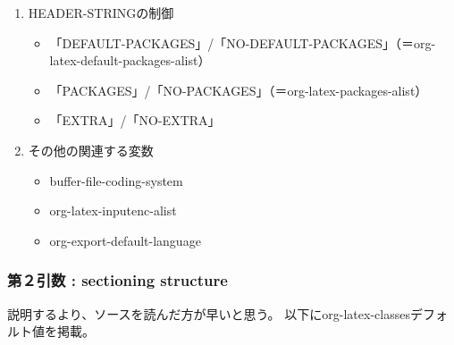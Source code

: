 \documentclass[dvipdfmx,12pt]{jsarticle}
\begin{document}
\begin{enumerate}
\item HEADER-STRINGの制御
\label{sec-3-1-1-1}
\begin{itemize}
\item 「DEFAULT-PACKAGES」/「NO-DEFAULT-PACKAGES」（＝org-latex-default-packages-alist）
\item 「PACKAGES」/「NO-PACKAGES」（＝org-latex-packages-alist）
\item 「EXTRA」/「NO-EXTRA」
\end{itemize}

\item その他の関連する変数
\label{sec-3-1-1-2}
\begin{itemize}
\item buffer-file-coding-system
\item org-latex-inputenc-alist
\item org-export-default-language
\end{itemize}
\end{enumerate}

\subsubsection{第２引数 : sectioning structure}
\label{sec-3-1-2}

説明するより、ソースを読んだ方が早いと思う。
以下にorg-latex-classesデフォルト値を掲載。
\end{document}
